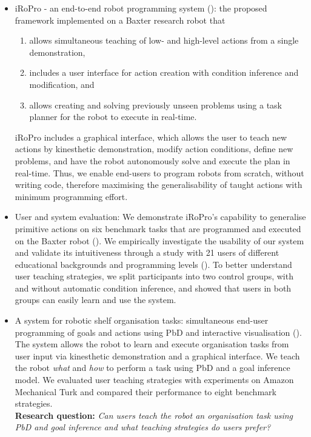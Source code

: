 \begin{itemize}
	\item {iRoPro - an end-to-end robot programming system (\cite{liang2018simultaneous}): the proposed framework implemented on a Baxter research robot that 
		\begin{enumerate}
			\item allows simultaneous teaching of low- and high-level actions from a single demonstration, 
			\item includes a user interface for action creation with condition inference and modification, and
			\item allows creating and solving previously unseen problems using a task planner for the robot to execute in real-time.
		\end{enumerate}
	iRoPro includes a graphical interface, which allows the user to teach new actions by kinesthetic demonstration, modify action conditions, define new problems, and have the robot autonomously solve and execute the plan in real-time.
	Thus, we enable end-users to program robots from scratch, without writing code, therefore maximising the generalisability of taught actions with minimum programming effort.}

	\item {User and system evaluation:
	We demonstrate iRoPro's capability to generalise primitive actions on six benchmark tasks that are programmed and executed on the Baxter robot ().
	We empirically investigate the usability of our system and validate its intuitiveness through a study with 21 users of different educational backgrounds and programming levels
	().
	To better understand user teaching strategies, we split participants into two control groups, with and without automatic condition inference, and showed that users in both groups can easily learn and use the system.}
	
	\item {A system for robotic shelf organisation tasks: simultaneous end-user programming of goals and actions using PbD and interactive visualisation (\cite{liang2018simultaneous}).
		The system allows the robot to learn and execute organisation tasks from user input via kinesthetic demonstration and a graphical interface.
		We teach the robot \textit{what} and \textit{how} to perform a task using PbD and a goal inference model.
		We evaluated user teaching strategies with experiments on Amazon Mechanical Turk and compared their performance to eight benchmark strategies.\\
		\textbf{Research question:} \textit{Can users teach the robot an organisation task using PbD and goal inference and what teaching strategies do users prefer?}}
	
\end{itemize}
